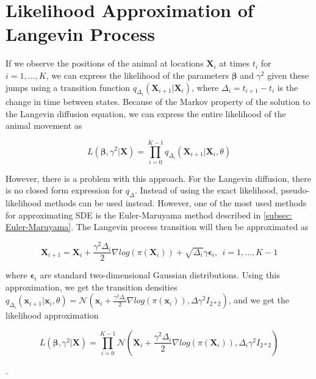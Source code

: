 \section{Likelihood Approximation of Langevin Process}
\label{sec: Likelihood Approximation of the Langevin Process}
If we observe the positions of the animal at locations $\textbf{X}_i$ at times $t_i$ for $i=1,\dots , K$, we can express the likelihood of the parameters $\bm{\beta}$ and $\gamma^2$ given these jumps using a transition function $q_{\Delta_i}(\textbf{X}_{i+1} | \textbf{X}_i)$, where $\Delta_i = t_{i+1} - t_i$ is the change in time between states. Because of the Markov property of the solution to the Langevin diffusion equation, we can express the entire likelihood of the animal movement as

\begin{equation}
    L(\bm{\beta}, \gamma^2 | \textbf{X}) = \prod_{i=0}^{K-1} q_{\Delta_i}(\textbf{X}_{i+1} | \textbf{X}_i, \theta)
    \label{eq: Langevin likelihood}
\end{equation}

However, there is a problem with this approach. For the Langevin diffusion, there is no closed form expression for $q_\Delta$\parencite{gloaguen_stochastic_2018}. Instead of using the exact likelihood, pseudo-likelihood methods can be used instead. However, one of the most used methods for approximating SDE is the Euler-Maruyama method described in \ref{subsec: Euler-Maruyama}. The Langevin process transition will then be approximated as

$$
    \textbf{X}_{i+1} = \textbf{X}_i + \frac{\gamma^2 \Delta_i}{2}\nabla log(\pi(\textbf{X}_i)) + \sqrt{\Delta_i}\gamma \bm{\epsilon}_i, \ \ i = 1,\dots , K-1
$$

where $\bm{\epsilon}_i$ are standard two-dimensional Gaussian distributions. Using this approximation, we get the transition densities $q_{\Delta_i}(\textbf{x}_{i+1} | \textbf{x}_i, \theta) = \mathcal{N}(\textbf{x}_i + \frac{\gamma^2 \Delta_i}{2}\nabla log(\pi(\textbf{x}_i)), \Delta \gamma^2 I_{2*2})$, and we get the likelihood approximation

$$L(\bm{\beta}, \gamma^2 | \textbf{X}) = \prod_{i=0}^{K-1} \mathcal{N}(\textbf{X}_i + \frac{\gamma^2 \Delta_i}{2}\nabla log(\pi(\textbf{X}_i)), \Delta_i \gamma^2 I_{2*2})$$

\parencite{iacus_simulation_2008}.






